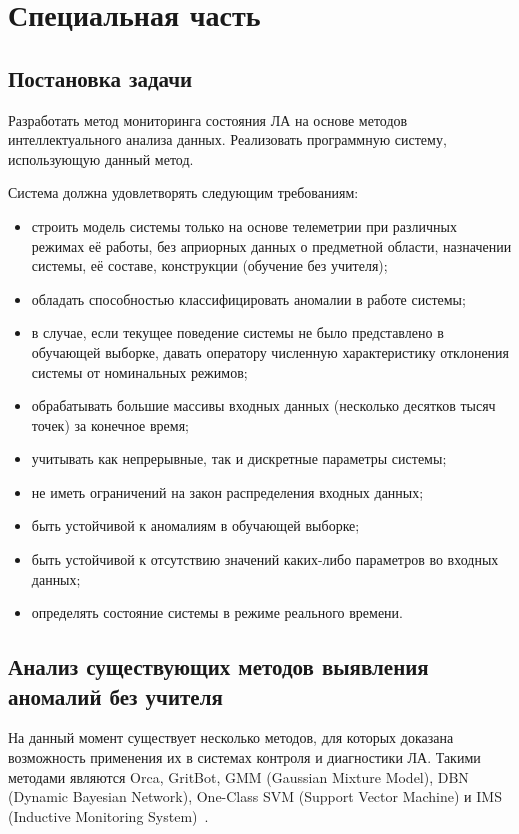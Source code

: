 \chapter{Специальная часть}
\section{Постановка задачи}
\label{sec:spec:ProblemDefinition}
Разработать метод мониторинга состояния ЛА на основе методов интеллектуального анализа данных. Реализовать программную систему, использующую данный метод.

Система должна удовлетворять следующим требованиям:
\begin{itemize}
	\item строить модель системы только на основе телеметрии при различных режимах её работы, без априорных данных о предметной области, назначении системы, её составе, конструкции (обучение без учителя);
	\item обладать способностью классифицировать аномалии в работе системы;
	\item в случае, если текущее поведение системы не было представлено в обучающей выборке, давать оператору численную характеристику отклонения системы от номинальных режимов;
	\item обрабатывать большие массивы входных данных (несколько десятков тысяч точек) за конечное время;
	\item учитывать как непрерывные, так и дискретные параметры системы;
	\item не иметь ограничений на закон распределения входных данных;
	\item быть устойчивой к аномалиям в обучающей выборке;
	\item быть устойчивой к отсутствию значений каких-либо параметров во входных данных;
	\item определять состояние системы в режиме реального времени.
\end{itemize}

\section{Анализ существующих методов выявления аномалий без учителя}
На данный момент существует несколько методов, для которых доказана возможность применения их в системах контроля и диагностики ЛА. Такими методами являются Orca, GritBot, GMM (Gaussian Mixture Model), DBN (Dynamic Bayesian Network), One-Class SVM (Support Vector Machine) и IMS (Inductive Monitoring System)~\cite{MartinCompUnsupervisedDetectionMethods}.

